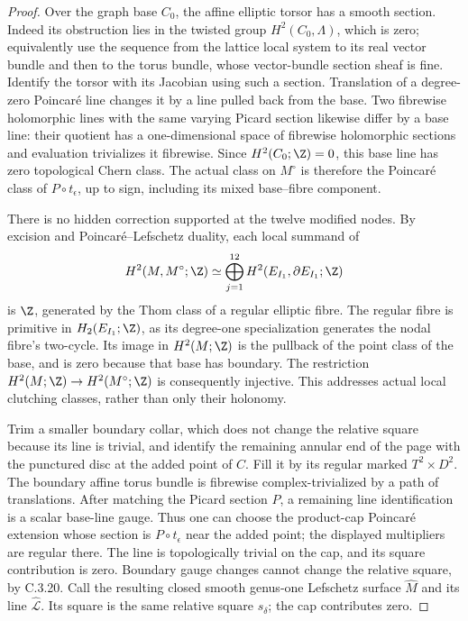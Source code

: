 \begin{proof}
Over the graph base $C_0$, the affine elliptic torsor has a
smooth section. Indeed its obstruction lies in the twisted
group $H^2(C_0,\Lambda)$, which is zero; equivalently use the
sequence from the lattice local system to its real vector
bundle and then to the torus bundle, whose vector-bundle
section sheaf is fine. Identify the torsor with its Jacobian
using such a section. Translation of a degree-zero Poincar\'e
line changes it by a line pulled back from the base. Two
fibrewise holomorphic lines with the same varying Picard
section likewise differ by a base line: their quotient has a
one-dimensional space of fibrewise holomorphic sections and
evaluation trivializes it fibrewise. Since $H^2(C_0;\Z)=0$,
this base line has zero topological Chern class. The actual
class on $M^\circ$ is therefore the Poincar\'e class of
$P\circ t_\epsilon$, up to sign, including its mixed
base--fibre component.

There is no hidden correction supported at the twelve modified
nodes. By excision and Poincar\'e--Lefschetz duality, each
local summand of
\[
 H^2(M,M^\circ;\Z)
 \simeq\bigoplus_{j=1}^{12}H^2(E_{I_1},\partial E_{I_1};\Z)
\]
is $\Z$, generated by the Thom class of a regular elliptic
fibre. The regular fibre is primitive in $H_2(E_{I_1};\Z)$,
as its degree-one specialization generates the nodal fibre's
two-cycle. Its image in $H^2(M;\Z)$ is the pullback of the
point class of the base, and is zero because that base has
boundary. The restriction $H^2(M;\Z)\to H^2(M^\circ;\Z)$
is consequently injective. This addresses actual local
clutching classes, rather than only their holonomy.

Trim a smaller boundary collar, which does not change the
relative square because its line is trivial, and identify the
remaining annular end of the page with the punctured disc at
the added point of $C$. Fill it by its regular marked
$T^2\times D^2$. The boundary affine torus bundle is
fibrewise complex-trivialized by a path of translations.
After matching the Picard section $P$, a remaining line
identification is a scalar base-line gauge. Thus one can choose
the product-cap Poincar\'e extension whose section is
$P\circ t_\epsilon$ near the added point; the displayed
multipliers are regular there. The line is topologically
trivial on the cap, and its square contribution is zero.
Boundary gauge changes cannot change the relative square, by
C.3.20. Call the resulting
closed smooth genus-one Lefschetz surface $\widehat M$ and its
line $\widehat{\mathcal L}$. Its square is the same relative
square $s_\delta$; the cap contributes zero.


\end{proof}
